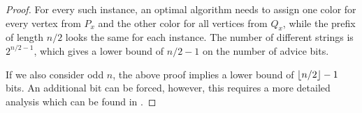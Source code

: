 \begin{proof}
    For every such instance, an optimal algorithm needs to assign one
    color for every vertex from $P_x$ and the other color for all vertices
    from $Q_x$, while the prefix of length $n/2$ looks the same for each
    instance. The number of different strings is $2^{n/2-1}$, which gives
    a lower bound of $n/2-1$ on the number of advice bits.

    If we also consider odd $n$, the above proof implies a lower bound of
    $\lfloor n/2\rfloor-1$ bits. An additional bit can be forced, however, this
    requires a more detailed analysis which can be found in
    \cite{misof-trivial-graphs}.
\end{proof}
